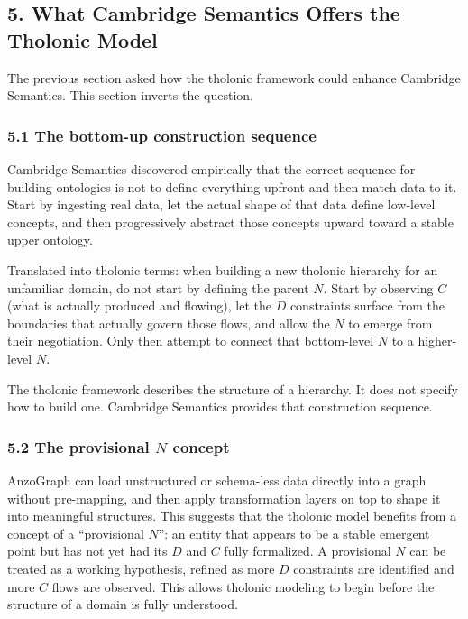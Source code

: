 \documentclass[
  11pt,
  letterpaper,
]{article}
\begin{document}
\subsection{5. What Cambridge Semantics Offers the Tholonic
Model}\label{what-cambridge-semantics-offers-the-tholonic-model}

The previous section asked how the tholonic framework could enhance
Cambridge Semantics. This section inverts the question.

\subsubsection{5.1 The bottom-up construction
sequence}\label{the-bottom-up-construction-sequence}

Cambridge Semantics discovered empirically that the correct sequence for
building ontologies is not to define everything upfront and then match
data to it. Start by ingesting real data, let the actual shape of that
data define low-level concepts, and then progressively abstract those
concepts upward toward a stable upper ontology.

Translated into tholonic terms: when building a new tholonic hierarchy
for an unfamiliar domain, do not start by defining the parent \(N\).
Start by observing \(C\) (what is actually produced and flowing), let
the \(D\) constraints surface from the boundaries that actually govern
those flows, and allow the \(N\) to emerge from their negotiation. Only
then attempt to connect that bottom-level \(N\) to a higher-level \(N\).

The tholonic framework describes the structure of a hierarchy. It does
not specify how to build one. Cambridge Semantics provides that
construction sequence.

\subsubsection{\texorpdfstring{5.2 The provisional \(N\)
concept}{5.2 The provisional N concept}}\label{the-provisional-n-concept}

AnzoGraph can load unstructured or schema-less data directly into a
graph without pre-mapping, and then apply transformation layers on top
to shape it into meaningful structures. This suggests that the tholonic
model benefits from a concept of a ``provisional \(N\)'': an entity that
appears to be a stable emergent point but has not yet had its \(D\) and
\(C\) fully formalized. A provisional \(N\) can be treated as a working
hypothesis, refined as more \(D\) constraints are identified and more
\(C\) flows are observed. This allows tholonic modeling to begin before
the structure of a domain is fully understood.
\end{document}

